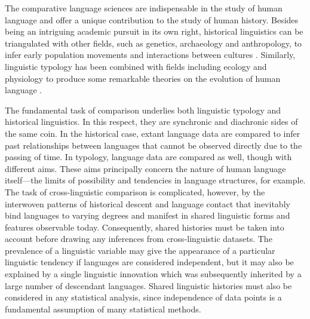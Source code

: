 The comparative language sciences are indispensable in the study of human language and offer a unique contribution to the study of human history. Besides being an intriguing academic pursuit in its own right, historical linguistics can be triangulated with other fields, such as genetics, archaeology and anthropology, to infer early population movements and interactions between cultures \autocites[e.g.][]{hunley_genetic_2008}{gray_language_2009}{bouckaert_mapping_2012}{malaspinas_genomic_2016}{bouckaert_origin_2018}. Similarly, linguistic typology has been combined with fields including ecology and physiology to produce some remarkable theories on the evolution of human language \autocites[e.g.][]{everett_climate_2015}{everett_languages_2017}{bentz_evolution_2018}{blasi_human_2019}.

The fundamental task of comparison underlies both linguistic typology and historical linguistics. In this respect, they are synchronic and diachronic sides of the same coin. In the historical case, extant language data are compared to infer past relationships between languages that cannot be observed directly due to the passing of time. In typology, language data are compared as well, though with different aims. These aims principally concern the nature of human language itself---the limits of possibility and tendencies in language structures, for example. The task of cross-linguistic comparison is complicated, however, by the interwoven patterns of historical descent and language contact that inevitably bind languages to varying degrees and manifest in shared linguistic forms and features observable today. Consequently, shared histories must be taken into account before drawing any inferences from cross-linguistic datasets. The prevalence of a linguistic variable may give the appearance of a particular linguistic tendency if languages are considered independent, but it may also be explained by a single linguistic innovation which was subsequently inherited by a large number of descendant languages. Shared linguistic histories must also be considered in any statistical analysis, since independence of data points is a fundamental assumption of many statistical methods.

